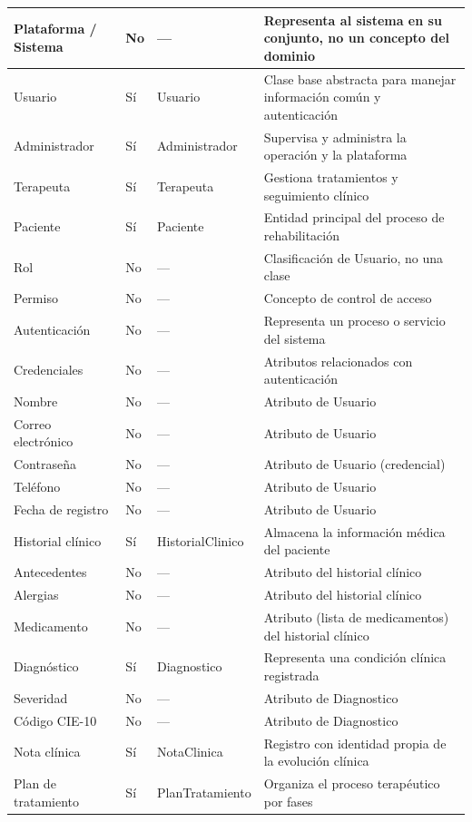 \documentclass[11pt,letterpaper,oneside]{report}
\begin{document}
\begin{longtable}{|L{3.5cm}|C{2.0cm}|L{3.3cm}|L{5.4cm}|}
Plataforma / Sistema & No & --- & Representa al sistema en su conjunto, no un concepto del dominio \\ \hline
Usuario & Sí & Usuario & Clase base abstracta para manejar información común y autenticación \\ \hline
Administrador & Sí & Administrador & Supervisa y administra la operación y la plataforma \\ \hline
Terapeuta & Sí & Terapeuta & Gestiona tratamientos y seguimiento clínico \\ \hline
Paciente & Sí & Paciente & Entidad principal del proceso de rehabilitación \\ \hline
Rol & No & --- & Clasificación de Usuario, no una clase \\ \hline
Permiso & No & --- & Concepto de control de acceso \\ \hline
Autenticación & No & --- & Representa un proceso o servicio del sistema \\ \hline
Credenciales & No & --- & Atributos relacionados con autenticación \\ \hline
Nombre & No & --- & Atributo de Usuario \\ \hline
Correo electrónico & No & --- & Atributo de Usuario \\ \hline
Contraseña & No & --- & Atributo de Usuario (credencial) \\ \hline
Teléfono & No & --- & Atributo de Usuario \\ \hline
Fecha de registro & No & --- & Atributo de Usuario \\ \hline
Historial clínico & Sí & HistorialClinico & Almacena la información médica del paciente \\ \hline
Antecedentes & No & --- & Atributo del historial clínico \\ \hline
Alergias & No & --- & Atributo del historial clínico \\ \hline
Medicamento & No & --- & Atributo (lista de medicamentos) del historial clínico \\ \hline
Diagnóstico & Sí & Diagnostico & Representa una condición clínica registrada \\ \hline
Severidad & No & --- & Atributo de Diagnostico \\ \hline
Código CIE-10 & No & --- & Atributo de Diagnostico \\ \hline
Nota clínica & Sí & NotaClinica & Registro con identidad propia de la evolución clínica \\ \hline
Plan de tratamiento & Sí & PlanTratamiento & Organiza el proceso terapéutico por fases \\ \hline

\end{longtable}
\end{document}
